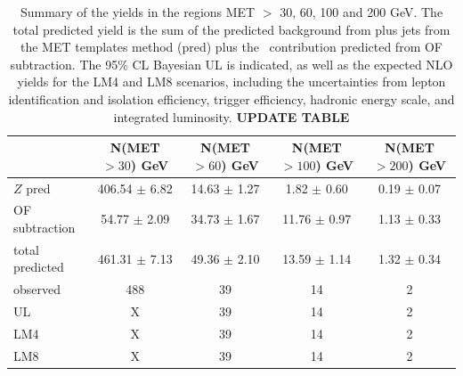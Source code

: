 \begin{table}[htb]
\begin{center}
\caption{\label{resultsyieldtable} 
Summary of the yields in the regions MET $>$ 30, 60, 100 and 200 GeV. The total predicted yield is the sum of the
predicted background from \Z plus jets from the MET templates method (\Z pred) plus the \ttbar\ contribution
predicted from OF subtraction. The 95\% CL Bayesian UL is indicated, as well as the expected NLO yields for the
LM4 and LM8 scenarios, including the uncertainties from lepton identification and isolation efficiency,
trigger efficiency, hadronic energy scale, and integrated luminosity.
{\bf UPDATE TABLE}
}
    \begin{tabular}{lcccc}
\hline
                        &   N(MET $>30$)  GeV    &   N(MET $>60$)  GeV    &   N(MET $>100$) GeV    &   N(MET $>200$) GeV \\
\hline
      $Z$ pred    &  406.54  $\pm$  6.82  &   14.63  $\pm$  1.27  &    1.82  $\pm$  0.60  &    0.19  $\pm$  0.07 \\
 OF subtraction   &   54.77  $\pm$  2.09  &   34.73  $\pm$  1.67  &   11.76  $\pm$  0.97  &    1.13  $\pm$  0.33 \\
\hline
 total predicted  &  461.31  $\pm$  7.13  &   49.36  $\pm$  2.10  &   13.59  $\pm$  1.14  &    1.32  $\pm$  0.34 \\
      observed    &                  488  &                   39  &                   14  &                    2 \\
\hline
            UL    &                    X  &                   39  &                   14  &                    2 \\
           LM4    &                    X  &                   39  &                   14  &                    2 \\
           LM8    &                    X  &                   39  &                   14  &                    2 \\
\hline
\end{tabular}
\end{center}
\end{table}

